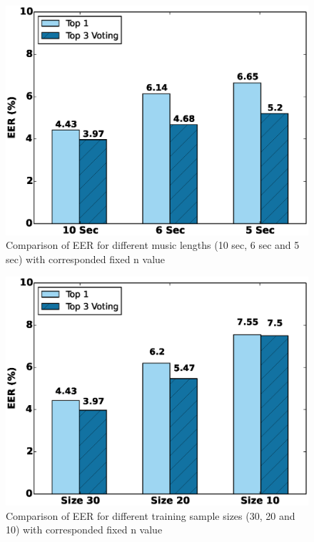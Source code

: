 \begin{figure}[t]
\centering
\includegraphics [width=.85\linewidth]{figure/exp2_vary_length.eps}
\caption{Comparison of EER for different music lengths (10 sec, 6 sec and 5 sec) with corresponded fixed n value}
\label{fig:eer-length}
\end{figure}

\begin{figure}[t]
\centering
\includegraphics [width=.85\linewidth]{figure/exp2_vary_size.eps}
\caption{Comparison of EER for different training sample sizes (30, 20 and 10) with corresponded fixed n value}
\label{fig:eer-size}
\end{figure}

